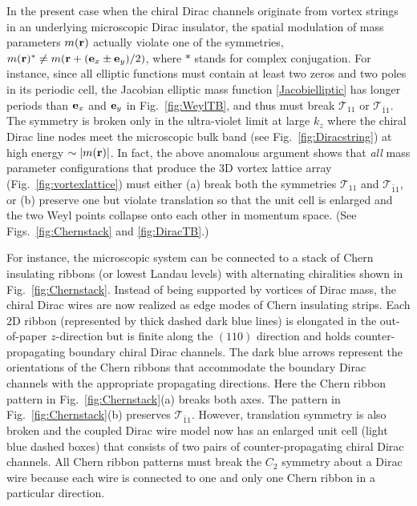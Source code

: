 In the present case when the chiral Dirac channels originate from vortex strings in an underlying microscopic Dirac insulator, the spatial modulation of mass parameters $m({\bf r})$ actually violate one of the \AFTR symmetries, $m({\bf r})^\ast\neq m({\bf r}+({\bf e}_x\pm{\bf e}_y)/2)$, where $\ast$ stands for complex conjugation. For instance, since all elliptic functions must contain at least two zeros and two poles in its periodic cell, the Jacobian elliptic mass function \eqref{Jacobielliptic} has longer periods than ${\bf e}_x$ and ${\bf e}_y$ in Fig.~\ref{fig:WeylTB}, and thus must break $\mathcal{T}_{11}$ or $\mathcal{T}_{\bar{1}1}$. The symmetry is broken only in the ultra-violet limit at large $k_z$ where the chiral Dirac line nodes meet the microscopic bulk band (see Fig.~\ref{fig:Diracstring}) at high energy $\sim|m({\bf r})|$. In fact, the above anomalous argument shows that {\em all} mass parameter configurations that produce the 3D vortex lattice array (Fig.~\ref{fig:vortexlattice}) must either (a) break both the \AFTR symmetries $\mathcal{T}_{11}$ and $\mathcal{T}_{\bar{1}1}$, or (b) preserve one but violate translation so that the unit cell is enlarged and the two Weyl points collapse onto each other in momentum space. (See Figs.~\ref{fig:Chernstack} and \ref{fig:DiracTB}.)

For instance, the microscopic system can be connected to a stack of Chern insulating ribbons (or lowest Landau levels) with alternating chiralities shown in Fig.~\ref{fig:Chernstack}. Instead of being supported by vortices of Dirac mass, the chiral Dirac wires are now realized as edge modes of Chern insulating strips. Each 2D ribbon (represented by thick dashed dark blue lines) is elongated in the out-of-paper $z$-direction but is finite along the $(110)$ direction and holds counter-propagating boundary chiral Dirac channels. The dark blue arrows represent the orientations of the Chern ribbons that accommodate the boundary Dirac channels with the appropriate propagating directions. Here the Chern ribbon pattern in Fig.~\ref{fig:Chernstack}(a) breaks both \AFTR axes. The pattern in Fig.~\ref{fig:Chernstack}(b) preserves $\mathcal{T}_{\bar{1}1}$. However, translation symmetry is also broken and the coupled Dirac wire model now has an enlarged unit cell (light blue dashed boxes) that consists of two pairs of counter-propagating chiral Dirac channels. All Chern ribbon patterns must break the $C_2$ symmetry about a Dirac wire because each wire is connected to one and only one Chern ribbon in a particular direction.

